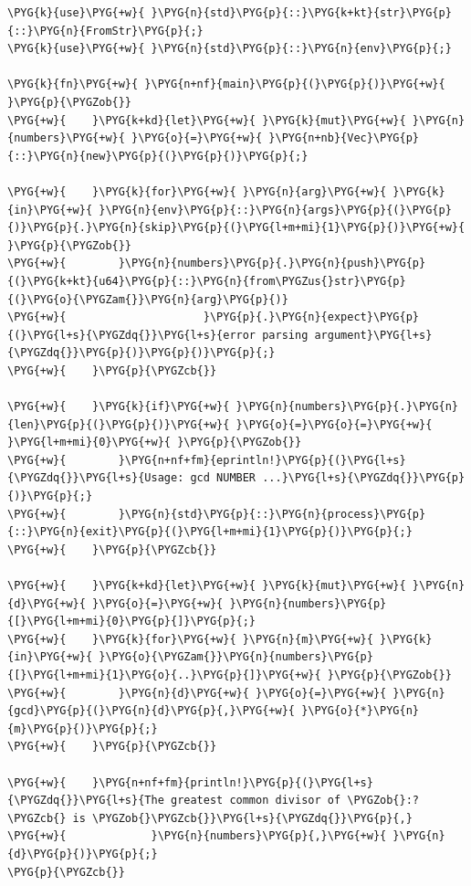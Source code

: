 \begin{Verbatim}[commandchars=\\\{\},breaklines=true,breakanywhere=true,fontsize=\codefont,xleftmargin=17bp]
\PYG{k}{use}\PYG{+w}{ }\PYG{n}{std}\PYG{p}{::}\PYG{k+kt}{str}\PYG{p}{::}\PYG{n}{FromStr}\PYG{p}{;}
\PYG{k}{use}\PYG{+w}{ }\PYG{n}{std}\PYG{p}{::}\PYG{n}{env}\PYG{p}{;}

\PYG{k}{fn}\PYG{+w}{ }\PYG{n+nf}{main}\PYG{p}{(}\PYG{p}{)}\PYG{+w}{ }\PYG{p}{\PYGZob{}}
\PYG{+w}{    }\PYG{k+kd}{let}\PYG{+w}{ }\PYG{k}{mut}\PYG{+w}{ }\PYG{n}{numbers}\PYG{+w}{ }\PYG{o}{=}\PYG{+w}{ }\PYG{n+nb}{Vec}\PYG{p}{::}\PYG{n}{new}\PYG{p}{(}\PYG{p}{)}\PYG{p}{;}

\PYG{+w}{    }\PYG{k}{for}\PYG{+w}{ }\PYG{n}{arg}\PYG{+w}{ }\PYG{k}{in}\PYG{+w}{ }\PYG{n}{env}\PYG{p}{::}\PYG{n}{args}\PYG{p}{(}\PYG{p}{)}\PYG{p}{.}\PYG{n}{skip}\PYG{p}{(}\PYG{l+m+mi}{1}\PYG{p}{)}\PYG{+w}{ }\PYG{p}{\PYGZob{}}
\PYG{+w}{        }\PYG{n}{numbers}\PYG{p}{.}\PYG{n}{push}\PYG{p}{(}\PYG{k+kt}{u64}\PYG{p}{::}\PYG{n}{from\PYGZus{}str}\PYG{p}{(}\PYG{o}{\PYGZam{}}\PYG{n}{arg}\PYG{p}{)}
\PYG{+w}{                     }\PYG{p}{.}\PYG{n}{expect}\PYG{p}{(}\PYG{l+s}{\PYGZdq{}}\PYG{l+s}{error parsing argument}\PYG{l+s}{\PYGZdq{}}\PYG{p}{)}\PYG{p}{)}\PYG{p}{;}
\PYG{+w}{    }\PYG{p}{\PYGZcb{}}

\PYG{+w}{    }\PYG{k}{if}\PYG{+w}{ }\PYG{n}{numbers}\PYG{p}{.}\PYG{n}{len}\PYG{p}{(}\PYG{p}{)}\PYG{+w}{ }\PYG{o}{=}\PYG{o}{=}\PYG{+w}{ }\PYG{l+m+mi}{0}\PYG{+w}{ }\PYG{p}{\PYGZob{}}
\PYG{+w}{        }\PYG{n+nf+fm}{eprintln!}\PYG{p}{(}\PYG{l+s}{\PYGZdq{}}\PYG{l+s}{Usage: gcd NUMBER ...}\PYG{l+s}{\PYGZdq{}}\PYG{p}{)}\PYG{p}{;}
\PYG{+w}{        }\PYG{n}{std}\PYG{p}{::}\PYG{n}{process}\PYG{p}{::}\PYG{n}{exit}\PYG{p}{(}\PYG{l+m+mi}{1}\PYG{p}{)}\PYG{p}{;}
\PYG{+w}{    }\PYG{p}{\PYGZcb{}}

\PYG{+w}{    }\PYG{k+kd}{let}\PYG{+w}{ }\PYG{k}{mut}\PYG{+w}{ }\PYG{n}{d}\PYG{+w}{ }\PYG{o}{=}\PYG{+w}{ }\PYG{n}{numbers}\PYG{p}{[}\PYG{l+m+mi}{0}\PYG{p}{]}\PYG{p}{;}
\PYG{+w}{    }\PYG{k}{for}\PYG{+w}{ }\PYG{n}{m}\PYG{+w}{ }\PYG{k}{in}\PYG{+w}{ }\PYG{o}{\PYGZam{}}\PYG{n}{numbers}\PYG{p}{[}\PYG{l+m+mi}{1}\PYG{o}{..}\PYG{p}{]}\PYG{+w}{ }\PYG{p}{\PYGZob{}}
\PYG{+w}{        }\PYG{n}{d}\PYG{+w}{ }\PYG{o}{=}\PYG{+w}{ }\PYG{n}{gcd}\PYG{p}{(}\PYG{n}{d}\PYG{p}{,}\PYG{+w}{ }\PYG{o}{*}\PYG{n}{m}\PYG{p}{)}\PYG{p}{;}
\PYG{+w}{    }\PYG{p}{\PYGZcb{}}

\PYG{+w}{    }\PYG{n+nf+fm}{println!}\PYG{p}{(}\PYG{l+s}{\PYGZdq{}}\PYG{l+s}{The greatest common divisor of \PYGZob{}:?\PYGZcb{} is \PYGZob{}\PYGZcb{}}\PYG{l+s}{\PYGZdq{}}\PYG{p}{,}
\PYG{+w}{             }\PYG{n}{numbers}\PYG{p}{,}\PYG{+w}{ }\PYG{n}{d}\PYG{p}{)}\PYG{p}{;}
\PYG{p}{\PYGZcb{}}
\end{Verbatim}

